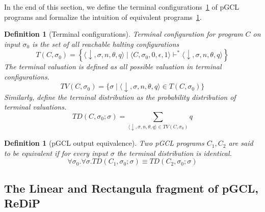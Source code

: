 \documentclass[a4paper]{article}
\newtheorem{definition}[theorem]{Definition}
\begin{document}
In the end of this section, we define the terminal configurations~\ref{def:pgcl-term} of pGCL programs and formalize the intuition of equivalent programs~\ref{def:pgcl-equiv}.

\begin{definition}[Terminal configurations]\label{def:pgcl-term}
	Terminal configuration for program \(C\) on input \(\sigma_0\) is the set of all reachable halting configurations
	\[
		T(C,\sigma_0) = \left\{
		\langle \downarrow,\sigma,n,\theta,q \rangle
		\mid
		\langle C,\sigma_0,0,\epsilon,1 \rangle
		\vdash^\ast
		\langle \downarrow,\sigma,n,\theta,q \rangle
		\right\}
	\]
	The terminal valuation is defined as all possible valuation in terminal configurations.
	\[
		TV(C,\sigma_0) =
		\{\sigma \mid
		\langle \downarrow,\sigma,n,\theta,q \rangle \in T(C,\sigma_0)
		\}
	\]
	Similarly, define the terminal distribution as the probability distribution of terminal valuations.
	\[
		TD(C,\sigma_0;\sigma) = \sum_{\langle \downarrow,\sigma, n,\theta, q \rangle \in TV(C,\sigma_0)} q
	\]
\end{definition}
\begin{definition}[pGCL output equivalence]\label{def:pgcl-equiv}
	Two pGCL programs \(C_1,C_2\) are said to be equivalent if for every input \(\sigma\) the terminal distribution is identical.
	\[
		\forall \sigma_0 . \forall \sigma . TD(C_1,\sigma_0; \sigma)\equiv TD(C_2,\sigma_0;\sigma)
	\]
\end{definition}

\subsection{The Linear and Rectangula fragment of pGCL, ReDiP}
\end{document}
